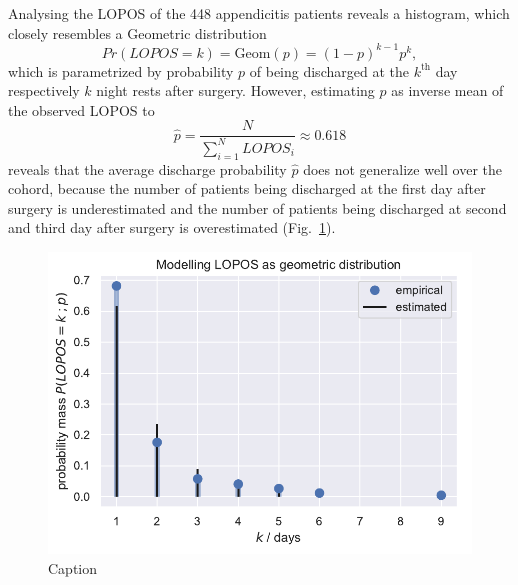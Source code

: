 \documentclass{elsarticle}
\begin{document}
Analysing the LOPOS of the 448 appendicitis patients reveals a histogram, which closely resembles a Geometric distribution
\begin{equation}
Pr(LOPOS=k) = \text{Geom}(p) = (1-p)^{k-1}p^{k},
\end{equation}
which is parametrized by probability $p$ of being discharged at the $k^\text{th}$ day respectively $k$ night rests after surgery. 
However, estimating $p$ as inverse mean of the observed LOPOS to 
\begin{equation}
 \hat{p} = \frac{N}{\sum\limits_{i=1}^N LOPOS_i} \approx 0.618	
\end{equation}
reveals that the average discharge probability $\hat{p}$ does not generalize well over the cohord, because the number of patients being discharged at the first day after surgery is underestimated and the number of patients being discharged at second and third day after surgery is overestimated (Fig.~\ref{fig:Geom}).

\begin{figure}
    \centering
    \includegraphics{images/DS19eH1_G0__empirical_geometric.pdf}
    \caption{Caption}
    \label{fig:Geom}
\end{figure}
\end{document}
